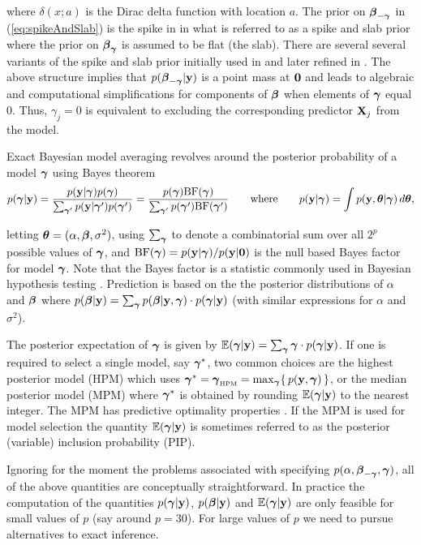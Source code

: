 \noindent where $\delta(x;a)$ is the Dirac delta function with location $a$.  
The prior on ${\boldsymbol \beta}_{-{\boldsymbol \gamma}}$ in (\ref{eq:spikeAndSlab}) is the spike in
in what is referred to as a spike and slab prior where the prior on ${\boldsymbol \beta}_{{\boldsymbol \gamma}}$ is assumed to be flat (the slab). There are several
several variants of the spike and slab prior initially used in
\cite{Mitchell1988}
and later refined in
\cite{George1993}. 
The above structure implies 
that $p({\boldsymbol \beta}_{-{\boldsymbol \gamma}}|{\bf y})$ is a point mass at ${\bf 0}$
and leads to
algebraic and computational simplifications for components of ${\boldsymbol \beta}$ when elements of ${\boldsymbol \gamma}$ equal 0.
Thus, $\gamma_j=0$ is equivalent to excluding the corresponding predictor ${\bf X}_j$ from the model.


Exact Bayesian model averaging revolves around the posterior
 probability of a model ${\boldsymbol \gamma}$ using Bayes theorem
$$
\displaystyle p({\boldsymbol \gamma}|{\bf y}) = \frac{p({\bf y}|{\boldsymbol \gamma})p({\boldsymbol \gamma})}{\sum_{{\boldsymbol \gamma}'} p({\bf y}|{\boldsymbol \gamma}')p({\boldsymbol \gamma}')} = \frac{p({\boldsymbol \gamma})\mbox{BF}({\boldsymbol \gamma})}{\sum_{{\boldsymbol \gamma}'} p({\boldsymbol \gamma}')\mbox{BF}({\boldsymbol \gamma}')}
\qquad \mbox{where} \qquad 
p({\bf y}|{\boldsymbol \gamma}) = \int p({\bf y},{\boldsymbol \theta}|{\boldsymbol \gamma}) \, d{\boldsymbol \theta},
$$

\noindent letting ${\boldsymbol \theta} = (\alpha,{\boldsymbol \beta},\sigma^2)$, using $\sum_{{\boldsymbol \gamma}}$ to denote a combinatorial sum over all
$2^p$ possible values of ${\boldsymbol \gamma}$, and $\mbox{BF}({\boldsymbol \gamma}) = p({\bf y}|{\boldsymbol \gamma})/p({\bf y}|{\bf 0})$
is the null based Bayes factor for model ${\boldsymbol \gamma}$.
Note that the Bayes factor is a statistic commonly used in Bayesian hypothesis testing 
\cite{Kass1995,OrmerodEtal2017}.
Prediction is based on the 
the posterior distributions of $\alpha$ and ${\boldsymbol \beta}$ where
$p({\boldsymbol \beta}|{\bf y}) = \sum_{{\boldsymbol \gamma}} p({\boldsymbol \beta}|{\bf y},{\boldsymbol \gamma}) \cdot p({\boldsymbol \gamma}|{\bf y})$
(with similar expressions for $\alpha$ and $\sigma^2$).

The 
posterior expectation of ${\boldsymbol \gamma}$ is given by
${\mathbb E}({\boldsymbol \gamma}|{\bf y}) = \sum_{{\boldsymbol \gamma}} {\boldsymbol \gamma} \cdot p({\boldsymbol \gamma}|{\bf y})$.
If one is required to select a single model, say ${\boldsymbol \gamma}^*$, two common choices are the 
highest posterior model (HPM) which uses ${\boldsymbol \gamma}^* = {\boldsymbol \gamma}_{\mbox{\tiny HPM}} = \max_{\boldsymbol \gamma} \{ \, p({\bf y},{\boldsymbol \gamma}) \, \}$, or the
median posterior model (MPM) where ${\boldsymbol \gamma}^*$ is obtained by
rounding ${\mathbb E}({\boldsymbol \gamma}|{\bf y})$ to the nearest integer.
The MPM has predictive optimality properties \cite{barbieri2004}.
If the MPM is used for model selection
the quantity ${\mathbb E}({\boldsymbol \gamma}|{\bf y})$ is sometimes referred to as the
posterior (variable) inclusion probability (PIP).

Ignoring for the moment the problems associated with specifying
$p(\alpha,{\boldsymbol \beta}_{-{\boldsymbol \gamma}},{\boldsymbol \gamma})$, all of the above quantities are conceptually
straightforward. In practice the computation of the quantities $p({\boldsymbol \gamma}|{\bf y})$, $p({\boldsymbol \beta}|{\bf y})$ and 
${\mathbb E}({\boldsymbol \gamma}|{\bf y})$ are only feasible for small values of $p$ (say around $p=30$). For large values of $p$ we need to pursue
alternatives to exact inference.

